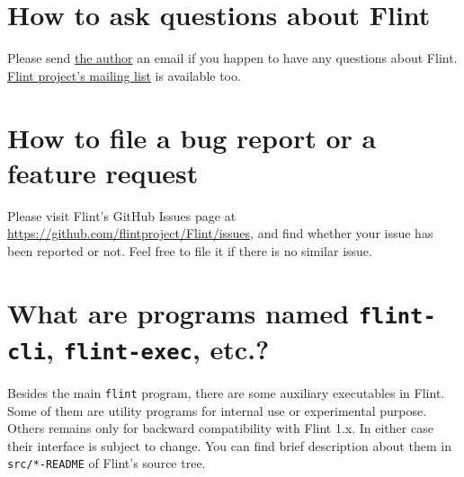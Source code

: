 \documentclass[a4paper,10pt]{report}
\newcommand{\filename}[1]{{\tt #1}}
\begin{document}
\section{How to ask questions about Flint}
Please send \href{mailto:tabe@fixedpoint.jp}{the author} an email if you happen
to have any questions about Flint.
\href{mailto:flint-discuss@googlegroups.com}{Flint project's mailing list} is
available too.

\section{How to file a bug report or a feature request}
Please visit Flint's GitHub Issues page at
\url{https://github.com/flintproject/Flint/issues},
and find whether your issue has been reported or not.
Feel free to file it if there is no similar issue.

\section{What are programs named \filename{flint-cli}, \filename{flint-exec}, etc.?}
Besides the main \filename{flint} program, there are some auxiliary executables in
Flint. Some of them are utility programs for internal use or experimental
purpose. Others remains only for backward compatibility with Flint 1.x. In
either case their interface is subject to change. You can find brief description about
them in \filename{src/*-README} of Flint's source tree.




\end{document}
